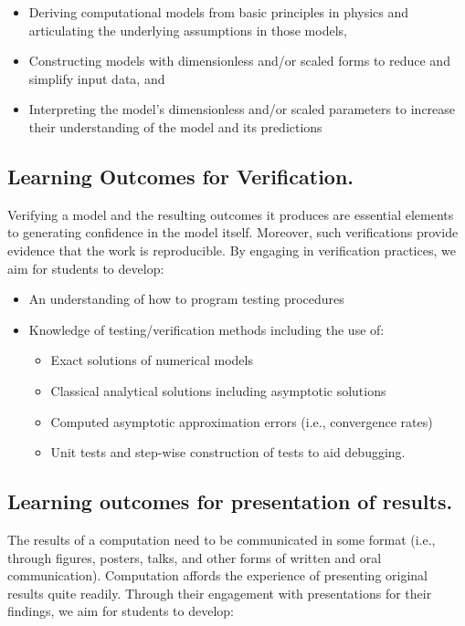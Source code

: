 \documentclass[graybox,envcountchap,sectrefs]{svmult}
\begin{document}
\begin{itemize}
\item Deriving computational models from basic principles in physics and articulating the underlying assumptions in those models,

\item Constructing models with dimensionless and/or scaled forms to reduce and simplify input data, and

\item Interpreting the model's dimensionless and/or scaled parameters to increase their understanding of the model and its predictions
\end{itemize}


\subsection{Learning Outcomes for Verification.}
Verifying a model and the resulting outcomes it produces are essential elements to generating confidence in the model itself. Moreover, such verifications provide evidence that the work is reproducible. By engaging in verification practices, we aim for students to develop:

\begin{itemize}
\item An understanding of how to program testing procedures

\item Knowledge of testing/verification methods including the use of:
\begin{itemize}

  \item Exact solutions of numerical models

  \item Classical analytical solutions including asymptotic solutions

  \item Computed asymptotic approximation errors (i.e., convergence rates)

  \item Unit tests and step-wise construction of tests to aid debugging.
\end{itemize}


\end{itemize}


\subsection{Learning outcomes for presentation of results.}
The results of a computation need to be communicated in some format (i.e., through figures, posters, talks, and other forms of written and oral communication). Computation affords the experience of presenting original results quite readily. Through their engagement with presentations for their findings, we aim for students to develop:
\end{document}
